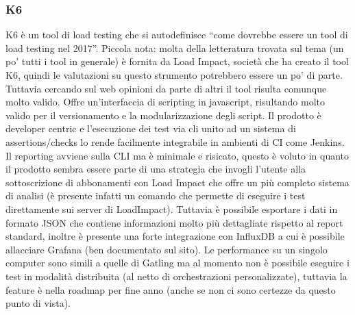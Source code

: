\subsubsection{K6}
K6 è un tool di load testing che si autodefinisce “come dovrebbe essere un tool di load testing nel 2017”.
Piccola nota: molta della letteratura trovata sul tema (un po’ tutti i tool in generale) è fornita da Load Impact, società che ha creato il tool K6, quindi le valutazioni su questo strumento potrebbero essere un po’ di parte. Tuttavia cercando sul web opinioni da parte di altri il tool risulta comunque molto valido. 
Offre un’interfaccia di scripting in javascript, risultando molto valido per il versionamento e la modularizzazione degli script. Il prodotto è developer centric e l’esecuzione dei test via cli unito ad un sistema di assertions/checks lo rende facilmente integrabile in ambienti di CI come Jenkins.
Il reporting avviene sulla CLI ma è minimale e risicato, questo è voluto in quanto il prodotto sembra essere parte di una strategia che invogli l’utente alla sottoscrizione di abbonamenti con Load Impact che offre un più completo sistema di analisi (è presente infatti un comando che permette di eseguire i test direttamente sui server di LoadImpact).
Tuttavia è possibile esportare i dati in formato JSON che contiene informazioni molto più dettagliate rispetto al report standard, inoltre è presente una forte integrazione con InfluxDB a cui è possibile allacciare Grafana (ben documentato sul sito).
Le performance su un singolo computer sono simili a quelle di Gatling ma al momento non è possibile eseguire i test in modalità distribuita (al netto di orchestrazioni personalizzate), tuttavia la feature è nella roadmap per fine anno (anche se non ci sono certezze da questo punto di vista).
